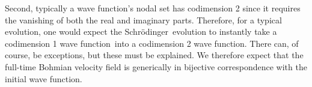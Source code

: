 \documentclass[11pt]{article}
\theoremstyle{remark}
\begin{document}
Second, typically a wave function's nodal set has codimension 2 since it
requires the vanishing of both the real and imaginary
parts. Therefore, for a typical evolution, one would expect the Schr\"odinger\
evolution to instantly take a codimension 1 wave function\ into a codimension 2
wave function. There can, of course, be exceptions, but these must be
explained. We therefore expect that the full-time Bohmian velocity field is
generically in bijective correspondence with the initial wave function.

\clearpage


\end{document}
